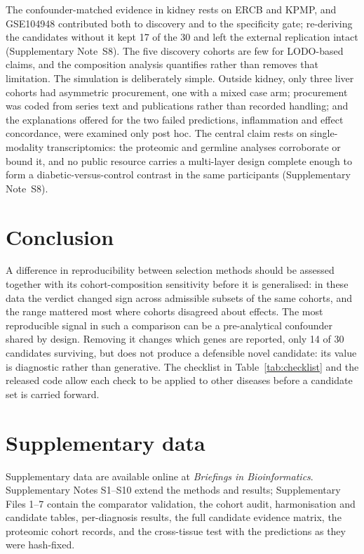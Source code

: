 \documentclass[unnumsec,webpdf,contemporary,large,numbered]{oup-authoring-template}
\begin{document}
The confounder-matched evidence in kidney rests on ERCB and KPMP, and GSE104948 contributed both to
discovery and to the specificity gate; re-deriving the candidates without it kept 17 of the 30 and
left the external replication intact (Supplementary Note~S8). The five discovery cohorts are few
for LODO-based claims, and the composition analysis quantifies rather than removes that
limitation. The simulation is deliberately simple. Outside kidney, only three liver cohorts had
asymmetric procurement, one with a mixed case arm; procurement was coded from series text and
publications rather than recorded handling; and the explanations offered for the two failed
predictions, inflammation and effect concordance, were examined only post hoc. The central claim
rests on single-modality transcriptomics: the proteomic and germline analyses corroborate or bound
it, and no public resource carries a multi-layer design complete enough to form a
diabetic-versus-control contrast in the same participants (Supplementary Note~S8).

\section{Conclusion}\label{sec:conclusion}

A difference in reproducibility between selection methods should be assessed together with its
cohort-composition sensitivity before it is generalised: in these data the verdict changed sign
across admissible subsets of the same cohorts, and the range mattered most where cohorts disagreed
about effects. The most reproducible signal in such a
comparison can be a pre-analytical confounder shared by design. Removing it changes which genes are
reported, only 14 of 30 candidates surviving, but does not produce a defensible novel candidate:
its value is diagnostic rather than generative. The checklist in Table~\ref{tab:checklist} and the
released code allow each check to be applied to other diseases before a candidate set is carried
forward.

\section{Supplementary data}

Supplementary data are available online at \textit{Briefings in Bioinformatics}. Supplementary
Notes S1--S10 extend the methods and results; Supplementary Files 1--7 contain the comparator
validation, the cohort audit, harmonisation and candidate tables, per-diagnosis results, the
full candidate evidence matrix, the proteomic cohort records, and the cross-tissue test with the
predictions as they were hash-fixed.
\end{document}
